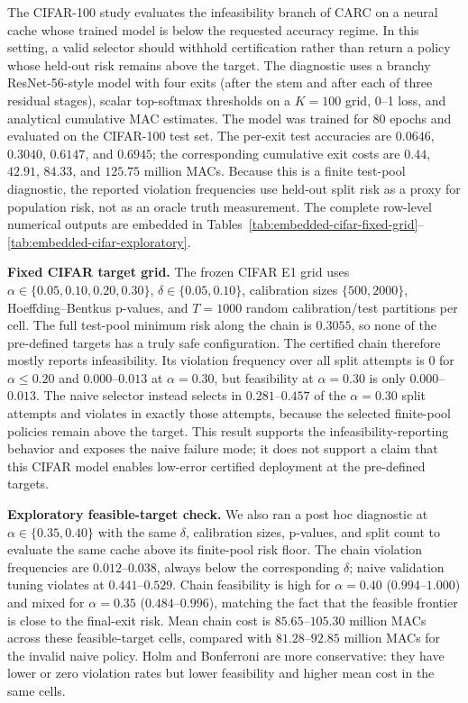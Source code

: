 \documentclass{ieeeaccess}
\begin{document}
The CIFAR-100 study evaluates the infeasibility branch of CARC on a neural cache whose trained model is below the requested accuracy regime. In this setting, a valid selector should withhold certification rather than return a policy whose held-out risk remains above the target. The diagnostic uses a branchy ResNet-56-style model with four exits (after the stem and after each of three residual stages), scalar top-softmax thresholds on a $K=100$ grid, 0--1 loss, and analytical cumulative MAC estimates. The model was trained for 80 epochs and evaluated on the CIFAR-100 test set. The per-exit test accuracies are $0.0646$, $0.3040$, $0.6147$, and $0.6945$; the corresponding cumulative exit costs are $0.44$, $42.91$, $84.33$, and $125.75$ million MACs. Because this is a finite test-pool diagnostic, the reported violation frequencies use held-out split risk as a proxy for population risk, not as an oracle truth measurement. The complete row-level numerical outputs are embedded in Tables~\ref{tab:embedded-cifar-fixed-grid}--\ref{tab:embedded-cifar-exploratory}.

\textbf{Fixed CIFAR target grid.} The frozen CIFAR E1 grid uses $\alpha\in\{0.05,0.10,0.20,0.30\}$, $\delta\in\{0.05,0.10\}$, calibration sizes $\{500,2000\}$, Hoeffding--Bentkus p-values, and $T=1000$ random calibration/test partitions per cell. The full test-pool minimum risk along the chain is $0.3055$, so none of the pre-defined targets has a truly safe configuration. The certified chain therefore mostly reports infeasibility. Its violation frequency over all split attempts is $0$ for $\alpha\le0.20$ and $0.000$--$0.013$ at $\alpha=0.30$, but feasibility at $\alpha=0.30$ is only $0.000$--$0.013$. The naive selector instead selects in $0.281$--$0.457$ of the $\alpha=0.30$ split attempts and violates in exactly those attempts, because the selected finite-pool policies remain above the target. This result supports the infeasibility-reporting behavior and exposes the naive failure mode; it does not support a claim that this CIFAR model enables low-error certified deployment at the pre-defined targets.

\textbf{Exploratory feasible-target check.} We also ran a post hoc diagnostic at $\alpha\in\{0.35,0.40\}$ with the same $\delta$, calibration sizes, p-values, and split count to evaluate the same cache above its finite-pool risk floor. The chain violation frequencies are $0.012$--$0.038$, always below the corresponding $\delta$; naive validation tuning violates at $0.441$--$0.529$. Chain feasibility is high for $\alpha=0.40$ ($0.994$--$1.000$) and mixed for $\alpha=0.35$ ($0.484$--$0.996$), matching the fact that the feasible frontier is close to the final-exit risk. Mean chain cost is $85.65$--$105.30$ million MACs across these feasible-target cells, compared with $81.28$--$92.85$ million MACs for the invalid naive policy. Holm and Bonferroni are more conservative: they have lower or zero violation rates but lower feasibility and higher mean cost in the same cells.
\end{document}

